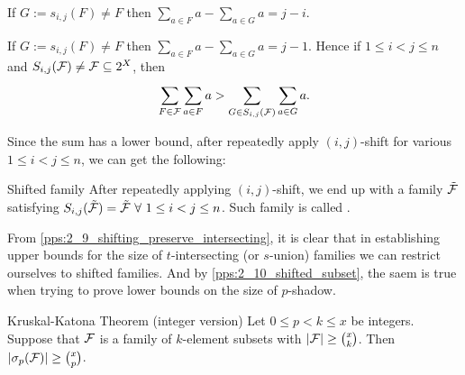 \begin{remark}
    If $G:=s_{i,j}(F)\neq F$ then $\sum_{a\in F}^{}a-\sum_{a\in G}^{}a=j-i$. 
\end{remark}

\begin{observation}[pps:]{}
    If $G:=s_{i,j}(F)\neq F$ then $\sum_{a\in F}^{}a-\sum_{a\in G}^{}a=j-1$. Hence if $1\leq i<j\leq n$ and $\sij(\FF)\neq \FF\subseteq 2^X$, then
    \[\sum_{F\in \FF}^{}\sum_{a\in F}^{}a>\sum_{G\in \sij(\FF)}^{}\sum_{a\in G}^{}a.\]
\end{observation}

\begin{remark}
    Since the sum has a lower bound, after repeatedly apply $(i,j)$-shift for various $1\leq i<j\leq n$, we can get the following:
\end{remark}

\begin{definition}[def:]{Shifted family}
    After repeatedly applying $(i,j)$-shift, we end up with a family $\tilde{\mathcal{F}}$ satisfying $\sij(\TF)=\TF\ \forall\ 1\leq i<j\leq n$. Such family is called .
\end{definition}

\begin{remark}
    From \cref{pps:2_9_shifting_preserve_intersecting}, it is clear that in establishing upper bounds for the size of $t$-intersecting (or $s$-union) families we can restrict ourselves to shifted families. And by \cref{pps:2_10_shifted_subset}, the saem is true when trying to prove lower bounds on the size of $p$-shadow.
\end{remark}

\begin{theorem}[thm:]{Kruskal-Katona Theorem (integer version)}
    Let $0\leq p<k\leq x$ be integers. Suppose that $\mathcal{F}$ is a family of $k$-element subsets with $\left|\mathcal{F}\right|\geq {x\choose k}$. Then $\left|\sigma _p(\mathcal{F})\right|\geq {x\choose p}$.
\end{theorem}

